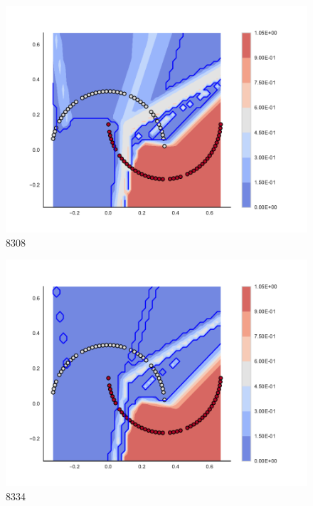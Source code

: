 \begin{subfigure}[b]{0.09\textwidth}
    \includegraphics[clip, trim=2.35cm 1.75cm 4.5cm 0cm,width=\textwidth]{img/convergence/8308.pdf}
    \caption{8308}
    \label{fig:convergence_8308}
\end{subfigure}
%
\begin{subfigure}[b]{0.09\textwidth}
    \includegraphics[clip, trim=2.35cm 1.75cm 4.5cm 0cm,width=\textwidth]{img/convergence/8334.pdf}
    \caption{8334}
    \label{fig:convergence_8334}
\end{subfigure}
%
